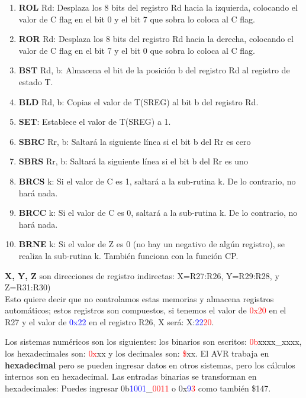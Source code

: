 \documentclass[
	12pt, %
	fleqn, %
	a4paper, %
	oneside, %
]{LegrandOrangeBook}
\begin{document}
\begin{enumerate}
\item \textbf{ROL} Rd: Desplaza los 8 bits del registro Rd hacia la izquierda, colocando el valor de C flag en el bit 0 y el bit 7 que sobra lo coloca al C flag.
\item \textbf{ROR} Rd: Desplaza los 8 bits del registro Rd hacia la derecha, colocando el valor de C flag en el bit 7 y el bit 0 que sobra lo coloca al C flag.
\item \textbf{BST} Rd, b: Almacena el bit de la posición b del registro Rd al registro de estado T.
\item \textbf{BLD} Rd, b: Copias el valor de T(SREG) al bit b del registro Rd.
\item \textbf{SET}: Establece el valor de T(SREG) a 1.
\item \textbf{SBRC} Rr, b: Saltará la siguiente línea si el bit b del Rr es cero
\item \textbf{SBRS} Rr, b: Saltará la siguiente línea si el bit b del Rr es uno
\item \textbf{BRCS} k: Si el valor de C es 1, saltará a la sub-rutina k. De lo contrario, no hará nada.
\item \textbf{BRCC} k: Si el valor de C es 0, saltará a la sub-rutina k. De lo contrario, no hará nada.
\item \textbf{BRNE} k: Si el valor de Z es 0 (no hay un negativo de algún registro), se realiza la sub-rutina k. También funciona con la función CP.
\end{enumerate}
\begin{definition}
\textbf{X, Y, Z} son direcciones de registro indirectas: X=R27:R26, Y=R29:R28, y
Z=R31:R30)\\
Esto quiere decir que no controlamos estas memorias y almacena registros automáticos; estos registros son compuestos, si tenemos el valor de \textcolor{red}{0x20} en el R27 y el valor de \textcolor{blue}{0x22} en el registro R26, X será: X:\textcolor{blue}{22}\textcolor{red}{20}. 
\end{definition}
\begin{remark}
Los sistemas numéricos son los siguientes: los binarios son escritos: \textcolor{red}{0b}xxxx\_xxxx, los hexadecimales son: \textcolor{red}{0x}xx y los decimales son: \textcolor{red}{\$}xx. El AVR trabaja en \textbf{hexadecimal} pero se pueden ingresar datos en otros sistemas, pero los cálculos internos son en hexadecimal. Las entradas binarias se transforman en hexadecimales: Puedes ingresar 0b\textcolor{blue}{1001}\_\textcolor{red}{0011} o 0x\textcolor{blue}{9}\textcolor{red}{3} como también \$147.
\end{remark}
\end{document}
